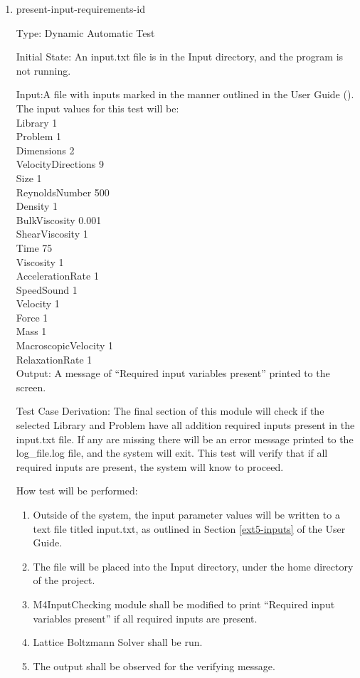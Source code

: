 \documentclass[12pt, titlepage]{article}
\newcommand{\myprogname}{Lattice Boltzmann Solver}
\newcounter{uvtestcounter} %
\begin{document}
\begin{enumerate}
	\item{present-input-requirements-id\theuvtestcounter\\}

Type: Dynamic Automatic Test

Initial State: An input.txt file is in the Input directory, and the program is not running.

Input:A file with inputs marked in the manner outlined in the
User Guide (\citet{LBM_UserGuide_PM}).\\The input values for this test will
be:\\

Library 1\\
Problem 1\\
Dimensions 2\\
VelocityDirections 9\\
Size 1\\
ReynoldsNumber 500\\
Density 1\\
BulkViscosity 0.001\\
ShearViscosity 1\\
Time 75\\
Viscosity 1\\
AccelerationRate 1\\
SpeedSound 1\\
Velocity 1\\
Force 1\\
Mass 1\\
MacroscopicVelocity 1\\
RelaxationRate 1\\

Output: A message of ``Required input variables present'' printed to the screen.

Test Case Derivation: The final section of this module will check if the selected Library and Problem have all addition required inputs present in the input.txt file. If any are missing there will be an error message printed to the log\_file.log file, and the system will exit. This test will verify that if all required inputs are present, the system will know to proceed. 

How test will be performed: 
\begin{enumerate}
	\item Outside of the system, the input parameter values will be written to a text file titled input.txt, as outlined in Section \ref{ext5-inputs} of the User Guide.
	\item The file will be placed into the Input directory, under the home directory of the project.
	\item M4InputChecking module shall be modified to print ``Required input variables present'' if all required inputs are present.
	\item {\myprogname} shall be run. 
	\item The output shall be observed for the verifying message.
\end{enumerate}
\end{enumerate}
\end{document}

